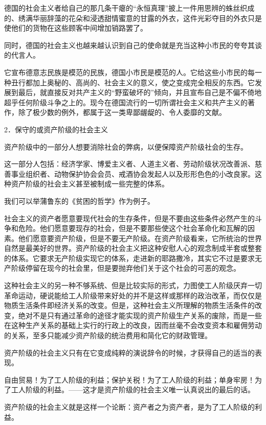     德国的社会主义者给自己的那几条干瘪的“永恒真理”披上一件用思辨的蛛丝织成的、绣满华丽辞藻的花朵和浸透甜情蜜意的甘露的外衣，这件光彩夺目的外衣只是使他们的货物在这些顾客中间增加销路罢了。

    同时，德国的社会主义也越来越认识到自己的使命就是充当这种小市民的夸夸其谈的代言人。

    它宣布德意志民族是模范的民族，德国小市民是模范的人。它给这些小市民的每一种丑行都加上奥秘的、高尚的、社会主义的意义，使之变成完全相反的东西。它发展到最后，就直接反对共产主义的“野蛮破坏的”倾向，并且宣布自己是不偏不倚地超乎任何阶级斗争之上的。现今在德国流行的一切所谓社会主义和共产主义的著作，除了极少数的例外，都属于这一类卑鄙龌龊的、令人委靡的文献。

    2．保守的或资产阶级的社会主义

    资产阶级中的一部分人想要消除社会的弊病，以便保障资产阶级社会的生存。

    这一部分人包括：经济学家、博爱主义者、人道主义者、劳动阶级状况改善派、慈善事业组织者、动物保护协会会员、戒酒协会发起人以及形形色色的小改良家。这种资产阶级的社会主义甚至被制成一些完整的体系。

    我们可以举蒲鲁东的《贫困的哲学》作为例子。

    社会主义的资产者愿意要现代社会的生存条件，但是不要由这些条件必然产生的斗争和危险。他们愿意要现存的社会，但是不要那些使这个社会革命化和瓦解的因素。他们愿意要资产阶级，但是不要无产阶级。在资产阶级看来，它所统治的世界自然是最美好的世界。资产阶级的社会主义把这种安慰人心的观念制成半套或整套的体系。它要求无产阶级实现它的体系，走进新的耶路撒冷，其实它不过是要求无产阶级停留在现今的社会里，但是要抛弃他们关于这个社会的可恶的观念。

    这种社会主义的另一种不够系统、但是比较实际的形式，力图使工人阶级厌弃一切革命运动，硬说能给工人阶级带来好处的并不是这样或那样的政治改革，而仅仅是物质生活条件即经济关系的改变。但是，这种社会主义所理解的物质生活条件的改变，绝对不是只有通过革命的途径才能实现的资产阶级生产关系的废除，而是一些在这种生产关系的基础上实行的行政上的改良，因而丝毫不会改变资本和雇佣劳动的关系，至多只能减少资产阶级的统治费用和简化它的财政管理。

    资产阶级的社会主义只有在它变成纯粹的演说辞令的时候，才获得自己的适当的表现。

    自由贸易！为了工人阶级的利益；保护关税！为了工人阶级的利益；单身牢房！为了工人阶级的利益。——这才是资产阶级的社会主义唯一认真说出的最后的话。

    资产阶级的社会主义就是这样一个论断：资产者之为资产者，是为了工人阶级的利益。

